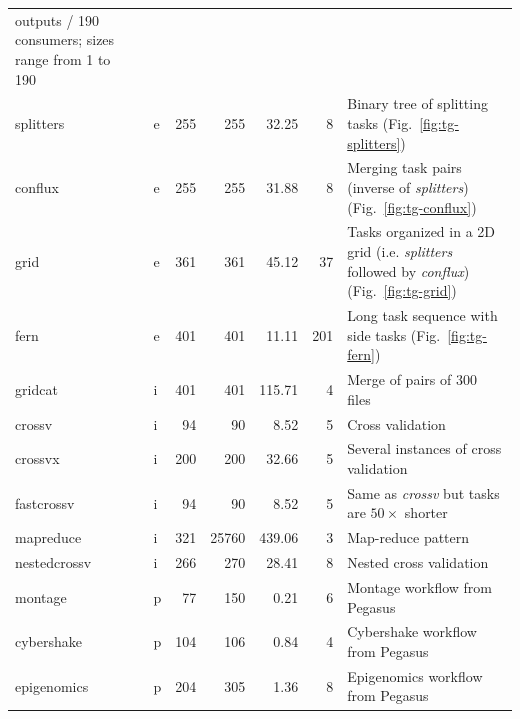 \begin{table}[h]
\begin{tabular}{l|lrrrr|T}
		outputs / 190 consumers; sizes range from 1 to \SI{190}{\mebi\byte}                        \\
		splitters        & e & 255 & 255   & 32.25  & 8   & Binary tree of
		splitting tasks (Fig.~\ref{fig:tg-splitters})                                              \\
		conflux          & e & 255 & 255   & 31.88  & 8   & Merging task pairs
		(inverse of \emph{splitters}) (Fig.~\ref{fig:tg-conflux})                                  \\
		grid             & e & 361 & 361   & 45.12  & 37  & Tasks organized in a 2D grid
		(i.e. \emph{splitters} followed by \emph{conflux}) (Fig.~\ref{fig:tg-grid})
		\\
		fern             & e & 401 & 401   & 11.11  & 201 & Long task sequence with
		side tasks (Fig.~\ref{fig:tg-fern})                                                        \\ \hline
		gridcat          & i & 401 & 401   & 115.71 & 4   & Merge of pairs of \SI{300}{\mebi\byte}
		files                                                                                      \\
		crossv           & i & 94  & 90    & 8.52   & 5   & Cross validation                       \\
		crossvx          & i & 200 & 200   & 32.66  & 5   & Several instances of cross
		validation                                                                                 \\
		fastcrossv       & i & 94  & 90    & 8.52   & 5   & Same as \emph{crossv}
		but tasks are $50\times$ shorter                                                           \\
		mapreduce        & i & 321 & \num{25760} & 439.06 & 3   & Map-reduce pattern                     \\
		nestedcrossv     & i & 266 & 270   & 28.41  & 8   & Nested cross
		validation                                                                                 \\ \hline
		montage          & p & 77  & 150   & 0.21   & 6   & Montage workflow
		from Pegasus                                                                               \\
		cybershake       & p & 104 & 106   & 0.84   & 4   & Cybershake
		workflow from Pegasus                                                                      \\
		epigenomics      & p & 204 & 305   & 1.36   & 8   & Epigenomics
		workflow from Pegasus                                                                      \\

\end{tabular}
\end{table}
